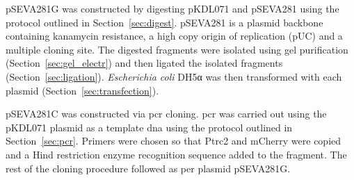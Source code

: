 pSEVA281G was constructed by digesting pKDL071 and pSEVA281 using the protocol outlined in Section~\ref{sec:digest}. pSEVA281 is a plasmid backbone containing kanamycin resistance, a high copy origin of replication (pUC) and a multiple cloning site. The digested fragments were isolated using gel purification (Section~\ref{sec:gel_electr}) and then ligated the isolated fragments (Section~\ref{sec:ligation}). \textit{Escherichia coli} DH5α was then transformed with each plasmid (Section~\ref{sec:transfection}). 

pSEVA281C was constructed via \acrshort{pcr} cloning. \acrshort{pcr} was carried out using the pKDL071 plasmid as a template \acrshort{dna} using the protocol outlined in Section~\ref{sec:pcr}. Primers were chosen so that Ptrc2 and mCherry were copied and a Hind restriction enzyme recognition sequence added to the fragment. The rest of the cloning procedure followed as per plasmid pSEVA281G.

